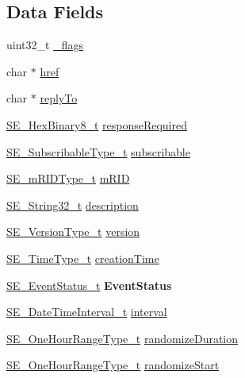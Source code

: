 \subsection*{Data Fields}
\begin{DoxyCompactItemize}
\item 
uint32\+\_\+t \hyperlink{group__RandomizableEvent_ga44a38708b02c27229ecb4d5e2b7c03d3}{\+\_\+flags}
\item 
char $\ast$ \hyperlink{group__RandomizableEvent_gae0c85b4710c2a67d48903e469e902161}{href}
\item 
char $\ast$ \hyperlink{group__RandomizableEvent_ga19e78ab6dd368078b3d4bb1702682e2b}{reply\+To}
\item 
\hyperlink{group__HexBinary8_gaecf2dab3615fb954a693c017a61f77d6}{S\+E\+\_\+\+Hex\+Binary8\+\_\+t} \hyperlink{group__RandomizableEvent_ga20fb6d1e039d742368e1025e2103aeab}{response\+Required}
\item 
\hyperlink{group__SubscribableType_ga5c41f553d369710ed34619266bf2551e}{S\+E\+\_\+\+Subscribable\+Type\+\_\+t} \hyperlink{group__RandomizableEvent_gaed50030cccbadde5ca606e7eb27cf4dd}{subscribable}
\item 
\hyperlink{group__mRIDType_gac74622112f3a388a2851b2289963ba5e}{S\+E\+\_\+m\+R\+I\+D\+Type\+\_\+t} \hyperlink{group__RandomizableEvent_ga2e2218e01dc1e3dd2428ced1eaaf0c3c}{m\+R\+ID}
\item 
\hyperlink{group__String32_gac9f59b06b168b4d2e0d45ed41699af42}{S\+E\+\_\+\+String32\+\_\+t} \hyperlink{group__RandomizableEvent_ga5ea5add0530a0829d95aad1326f7df9b}{description}
\item 
\hyperlink{group__VersionType_ga4b8d27838226948397ed99f67d46e2ae}{S\+E\+\_\+\+Version\+Type\+\_\+t} \hyperlink{group__RandomizableEvent_ga4aff0ff7df5bffb212069832a6e7387b}{version}
\item 
\hyperlink{group__TimeType_ga6fba87a5b57829b4ff3f0e7638156682}{S\+E\+\_\+\+Time\+Type\+\_\+t} \hyperlink{group__RandomizableEvent_gadf7708c10d4b88cd791c61a0fcd5975b}{creation\+Time}
\item 
\hyperlink{structSE__EventStatus__t}{S\+E\+\_\+\+Event\+Status\+\_\+t} {\bfseries Event\+Status}
\item 
\hyperlink{structSE__DateTimeInterval__t}{S\+E\+\_\+\+Date\+Time\+Interval\+\_\+t} \hyperlink{group__RandomizableEvent_gae999a6ae1f1d2329c6432ed09f24f327}{interval}
\item 
\hyperlink{group__OneHourRangeType_ga2b9c57435b20a5fc0689922b77e97c2d}{S\+E\+\_\+\+One\+Hour\+Range\+Type\+\_\+t} \hyperlink{group__RandomizableEvent_ga6e6106d5c42ed5e0148e74fec7ff7e40}{randomize\+Duration}
\item 
\hyperlink{group__OneHourRangeType_ga2b9c57435b20a5fc0689922b77e97c2d}{S\+E\+\_\+\+One\+Hour\+Range\+Type\+\_\+t} \hyperlink{group__RandomizableEvent_ga57f58e1327bdf7b248fd53ce7590c13d}{randomize\+Start}
\end{DoxyCompactItemize}



